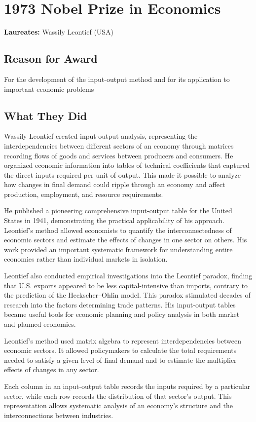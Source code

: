 \chapter{1973 Nobel Prize in Economics}
\textbf{Laureates: }Wassily Leontief (USA)

\section*{Reason for Award}
For the development of the input-output method and for its application to important economic
problems

\section{What They Did}
Wassily Leontief created input-output analysis, representing the interdependencies between
different sectors of an economy through matrices recording flows of goods and services between
producers and consumers. He organized economic information into tables of technical coefficients
that captured the direct inputs required per unit of output. This made it possible to analyze how
changes in final demand could ripple through an economy and affect production, employment, and
resource requirements.

He published a pioneering comprehensive input-output table for the United States in 1941,
demonstrating the practical applicability of his approach. Leontief's method allowed economists
to quantify the interconnectedness of economic sectors and estimate the effects of changes in one
sector on others. His work provided an important systematic framework for understanding entire
economies rather than individual markets in isolation.

Leontief also conducted empirical investigations into the Leontief paradox, finding that U.S.
exports appeared to be less capital-intensive than imports, contrary to the prediction of the
Heckscher--Ohlin model. This paradox stimulated decades of research into the factors determining
trade patterns. His input-output tables became useful tools for economic planning and policy
analysis in both market and planned economies.

Leontief's method used matrix algebra to represent interdependencies between economic sectors.
It allowed policymakers to calculate the total requirements needed to satisfy a given level of
final demand and to estimate the multiplier effects of changes in any sector.

Each column in an input-output table records the inputs required by a particular sector, while
each row records the distribution of that sector's output. This representation allows systematic
analysis of an economy's structure and the interconnections between industries.

